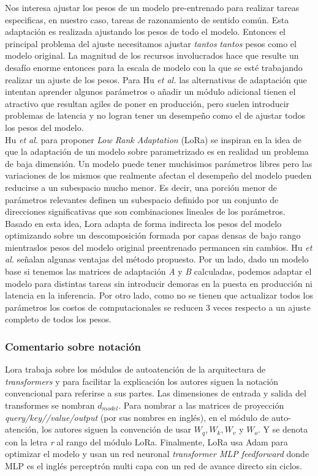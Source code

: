 \documentclass{book}
\begin{document}
Nos interesa ajustar los pesos de un modelo pre-entrenado para realizar tareas especificas, en nuestro caso, tareas de razonamiento de sentido común. Esta adaptación es realizada ajustando los pesos de todo el modelo. Entonces el principal problema del ajuste necesitamos ajustar \textit{tantos} \textit{tantos} pesos como el modelo original. La magnitud de los recursos involucrados hace que resulte un desafío enorme entonces para la escala de modelo con la que se esté trabajando realizar un ajuste de los pesos.
Para Hu \textit{et al.} las alternativas de adaptación que intentan aprender algunos parámetros o añadir un módulo adicional tienen el atractivo que resultan agiles de poner en producción, pero suelen introducir problemas de latencia y no logran tener un desempeño como el de ajustar todos los pesos del modelo. \\

Hu \textit{et al.} para proponer  \textit{Low Rank Adaptation} (LoRa) se inspiran en la idea de que la adaptación de un modelo sobre parametrizado es en realidad un problema de baja dimensión. Un modelo puede tener muchisimos parámetros libres pero las variaciones de los mismos que realmente afectan el desempeño del modelo pueden reducirse a un subespacio mucho menor. Es decir, una porción menor de parámetros relevantes definen un subespacio definido por un conjunto de direcciones significativas que son combinaciones lineales de los parámetros. Basado en esta idea, Lora adapta de forma indirecta los pesos del modelo optimizando sobre un descomposición formada por capas densas de bajo rango mientraslos pesos del modelo original preentrenado permancen sin cambios.
Hu \textit{et al.} señalan algunas ventajas del método propuesto. Por un lado, dado un modelo base si tenemos las matrices de adaptación \textit{A} y \textit{B} calculadas, podemos adaptar el modelo para distintas tareas sin introducir demoras en la puesta en producción ni latencia en la inferencia. Por otro lado, como no se tienen que actualizar todos los parámetros los costos de computacionales se reducen 3 veces respecto a un ajuste completo de todos los pesos. \\

\subsubsection{Comentario sobre notación}
Lora trabaja sobre los módulos de autoatención de la arquitectura de \textit{transformers} y para facilitar la explicación los autores siguen la notación convencional para referirse a sus partes. Las dimensiones de entrada y salida del transformes se nombran $d_{model}$. Para nombrar a las matrices de proyección \textit{query/key//value/output} (por sus nombres en inglés),  en el módulo de auto-atención, los autores siguen la convención de usar $W_q, W_k, W_v$ y $W_o$. Y se denota con la letra \textit{r} al rango del módulo LoRa. Finalmente, LoRa usa Adam para optimizar el modelo y usan un red neuronal \textit{transformer MLP feedforward} donde MLP es el inglés perceptrón multi capa con un red de avance directo sin ciclos. 
\end{document}
